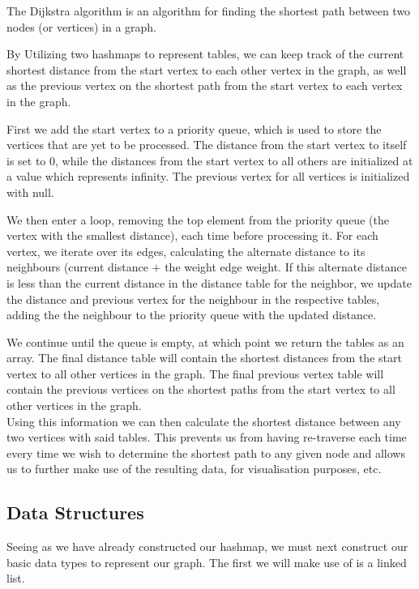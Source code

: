 \documentclass[a4paper]{article}
\begin{document}
The Dijkstra algorithm is an algorithm for finding the shortest path between two nodes (or vertices) in a graph.

By Utilizing two hashmaps to represent tables, we can
keep track of the current shortest distance from the start vertex to each other vertex in the graph,
as well as the previous vertex on the shortest path from the start vertex to each vertex in the graph.

First we add the start vertex to a priority queue,
which is used to store the vertices that are yet to be processed. 
The distance from the start vertex to itself is set to 0, 
while the distances from the start vertex to all others are initialized at a value which represents infinity. 
The previous vertex for all vertices is initialized with null.

We then enter a loop, removing the top element from the priority queue
(the vertex with the smallest distance), each time before processing it. 
For each vertex, we iterate over its edges, calculating the alternate distance to its neighbours 
(current distance $+$ the weight edge weight.
If this alternate distance is less than the current distance in the distance table for the neighbor, 
we update the distance and previous vertex for the neighbour in the respective tables, adding the 
the neighbour to the priority queue with the updated distance.

We continue until the queue is empty,
at which point we return the tables as an array. 
The final distance table will contain the shortest distances from the start vertex to all other vertices in the graph.
The final previous vertex table will contain the previous vertices on the shortest paths from the start vertex to all other vertices in the graph. \\

Using this information we can then calculate the shortest distance between any two vertices with said tables. 
This prevents us from having re-traverse each time every time we wish to determine the shortest path to any given node 
and allows us to further make use of the resulting data, for visualisation purposes, etc.



\subsection{Data Structures}

Seeing as we have already constructed our hashmap, we must next construct our basic data types 
to represent our graph. The first we will make use of is a linked list. \\
\end{document}
